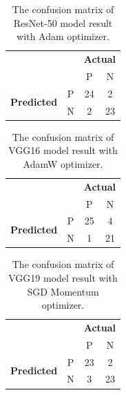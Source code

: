 \begin{table}[!h]
	\centering
	\caption{The confusion matrix of ResNet-50 model result with Adam optimizer.}
	\label{tab:conf_resnet50}
	\begin{tabular}{|cc|c|c|}
		\cline{1-4}
		&   & \multicolumn{2}{c|}{\textbf{Actual}} \\ \cline{3-4} 
		&   & P            & N            \\ \hline
		\multicolumn{1}{|c|}{\multirow{2}{*}{\textbf{Predicted}}} & P & 24           & 2            \\ \cline{2-4} 
		\multicolumn{1}{|c|}{}                           & N & 2            & 23           \\ \hline
	\end{tabular}
\end{table}

\begin{table}[!h]
	\centering
	\caption{The confusion matrix of VGG16 model result with AdamW optimizer.}
	\label{tab:conf_vgg16}
	\begin{tabular}{|cc|c|c|}
		\cline{1-4}
		&   & \multicolumn{2}{c|}{\textbf{Actual}} \\ \cline{3-4} 
		&   & P            & N            \\ \hline
		\multicolumn{1}{|c|}{\multirow{2}{*}{\textbf{Predicted}}} & P & 25           & 4            \\ \cline{2-4} 
		\multicolumn{1}{|c|}{}                           & N & 1            & 21           \\ \hline
	\end{tabular}
\end{table}

\begin{table}[!h]
	\centering
	\caption{The confusion matrix of VGG19 model result with SGD Momentum optimizer.}
	\label{tab:conf_vgg19}
	\begin{tabular}{|cc|c|c|}
		\cline{1-4}
		&   & \multicolumn{2}{c|}{\textbf{Actual}} \\ \cline{3-4} 
		&   & P            & N            \\ \hline
		\multicolumn{1}{|c|}{\multirow{2}{*}{\textbf{Predicted}}} & P & 23           & 2            \\ \cline{2-4} 
		\multicolumn{1}{|c|}{}                           & N & 3            & 23           \\ \hline
	\end{tabular}
\end{table}


